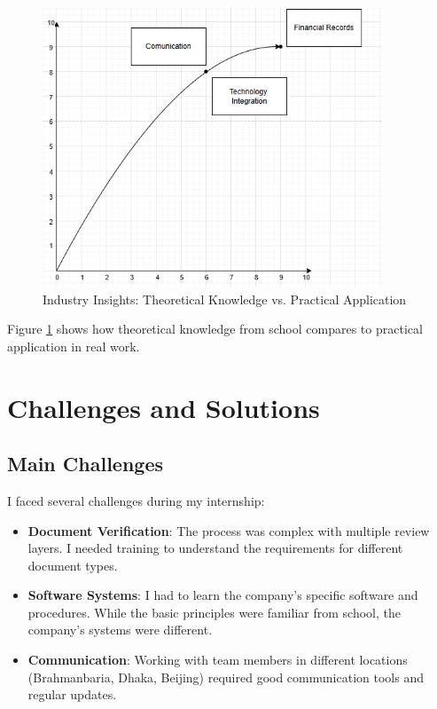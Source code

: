 \begin{figure}[H]
    \centering
    \includegraphics[width=0.9\textwidth]{assets/images/industry_insights_matrix.png}
    \caption{Industry Insights: Theoretical Knowledge vs. Practical Application}
    \label{fig:industry_insights_matrix}
\end{figure}

Figure \ref{fig:industry_insights_matrix} shows how theoretical knowledge from school compares to practical application in real work.

\vspace{0.5em}
\section{Challenges and Solutions}

\subsection{Main Challenges}
I faced several challenges during my internship:

\begin{itemize}[leftmargin=*, itemsep=0.25em]
    \item \textbf{Document Verification}: The process was complex with multiple review layers. I needed training to understand the requirements for different document types.
    \item \textbf{Software Systems}: I had to learn the company's specific software and procedures. While the basic principles were familiar from school, the company's systems were different.
    \item \textbf{Communication}: Working with team members in different locations (Brahmanbaria, Dhaka, Beijing) required good communication tools and regular updates.
\end{itemize}

